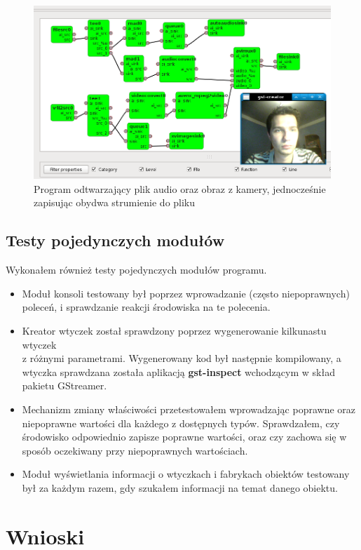 \documentclass[12pt]{article}
\begin{document}
\begin{figure}[H]
  \includegraphics[width=160mm]{img/main-test-screen2.png}
  \caption{Program odtwarzający plik audio oraz obraz z kamery, jednocześnie zapisując obydwa strumienie do pliku}
  \label{fig:mainTestScreen2}
\end{figure}


\subsection{Testy pojedynczych modułów}
Wykonałem również testy pojedynczych modułów programu.
\begin{itemize}
  \setlength{\itemsep}{0em}
\item Moduł konsoli testowany był poprzez wprowadzanie (często niepoprawnych) poleceń, i sprawdzanie reakcji środowiska na te polecenia.
\item Kreator wtyczek został sprawdzony poprzez wygenerowanie kilkunastu wtyczek \\z różnymi parametrami. Wygenerowany kod był następnie kompilowany, a wtyczka sprawdzana została aplikacją \textbf{gst-inspect} wchodzącym w skład pakietu GStreamer.
\item Mechanizm zmiany właściwości przetestowałem wprowadzając poprawne oraz niepoprawne wartości dla każdego z dostępnych typów. Sprawdzałem, czy środowisko odpowiednio zapisze poprawne wartości, oraz czy zachowa się w sposób oczekiwany przy niepoprawnych wartościach.
\item Moduł wyświetlania informacji o wtyczkach i fabrykach obiektów testowany był za każdym razem, gdy szukałem informacji na temat danego obiektu.
\end{itemize}
\cleardoublepage
\section{Wnioski}
\end{document}
